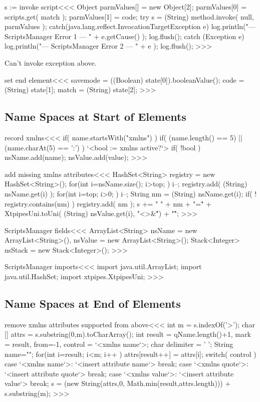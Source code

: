 \documentclass{article}
\begin{document}
\<s := invoke script\><<<
Object parmValues[] = new Object[2];
parmValues[0] = scripts.get( match );
parmValues[1] = code;
try {
  s = (String) method.invoke( null, parmValues );
} catch(java.lang.reflect.InvocationTargetException e){
   log.println("--- ScriptsManager Error 1 --- " + e.getCause() );
   log.flush();
} catch (Exception e){
   log.println("--- ScriptsManager Error 2 --- " + e );
   log.flush();
}
>>>


Can't invoke exception above.

\<set end element\><<<
savemode = ((Boolean) state[0]).booleanValue();
code = (String) state[1];
match = (String) state[2];
>>>




\subsection{Name Spaces at Start of Elements}

\<record xmlns\><<<
if( name.startsWith("xmlns") ){
  if( (name.length() == 5) || (name.charAt(5) == ':') ){
     `<bool := xmlns active?`>
     if( !bool ){
        nsName.add(name); nsValue.add(value);
} }  }
>>>





\<add missing xmlns attributes\><<<
HashSet<String> registry = new HashSet<String>();
for(int i=nsName.size(); i>top; ){
  i--;
  registry.add( (String) nsName.get(i) );
}
for(int i=top; i>0; ){
  i--;
  String nm = (String) nsName.get(i);
  if( ! registry.contains(nm) ){
     registry.add( nm );
     s += " " + nm + "=\"" +
         XtpipesUni.toUni( (String) nsValue.get(i), "<>&\"") + "\"";
} }
>>>




\<ScriptsManager fields\><<<
ArrayList<String> nsName = new ArrayList<String>(),
                         nsValue = new ArrayList<String>();
Stack<Integer> nsStack = new Stack<Integer>();
>>>

\<ScriptsManager imports\><<<
import java.util.ArrayList;
import java.util.HashSet;
import xtpipes.XtpipesUni;
>>>


\subsection{Name Spaces at End of Elements}


\<remove xmlns attributes supported from above\><<<
int m = s.indexOf('>');
char [] attrs = s.substring(0,m).toCharArray();
int result = qName.length()+1,
    mark = result,
    from=-1,
    control = `<xmlns name`>;
char delimiter = ' ';
String name="";
for(int i=result; i<m; i++ ){
  attrs[result++] = attrs[i];
  switch( control ){
    case  `<xmlns name`>: { `<insert attribute name`>  break; }
    case `<xmlns quote`>: { `<insert attribute quote`> break; }
    case `<xmlns value`>: { `<insert attribute value`> break; }
} }
s =  (new String(attrs,0, Math.min(result,attrs.length)))
          + s.substring(m);
>>>
\end{document}

